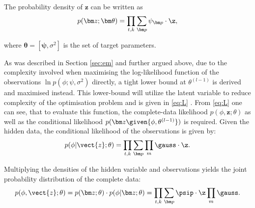 The probability density of $\bm z$ can be written as  %
\begin{equation}
    p(\bm z;\bm\theta)=\prod_{t,k}\sum_{\bm p}\psi_{\bm p}\cdot\z,
\end{equation}

where $\bm\theta=[\bm\psi,\sigma^2]$ is the set of target parameters.


As was described in Section \ref{sec:em} and further argued above, due to the complexity involved when maximising the log-likelihood function of the observations $\ln p(\phi;\psi, \sigma^2)$ directly, a tight lower bound at $\theta^{(l-1)}$ is derived and maximised instead. This lower-bound will utilize the latent variable to reduce complexity of the optimisation problem and is given in \eqref{eq:L} . From \eqref{eq:L} one can see, that to evaluate this function, the complete-data likelihood $p(\phi,\bm z; \theta)$ as well as the conditional likelihood $p(\bm z\given{\phi, \theta^{(l-1)}})$ is required. Given the hidden data, the conditional likelihood of the observations is given by:
\begin{equation}
    p(\phi |\vect{z};\theta)=\prod_{t,k}\sum_{\bm p}\prod_{m}\gauss\cdot\z.
\end{equation}

Multiplying the densities of the hidden variable and observations yields the joint probability distribution of the complete data:
\begin{equation}
    p(\phi,\vect{z};\theta)=p(\bm z;\theta)\cdot p(\phi |\bm z;\theta)=\prod_{t,k}\sum_{\bm p}\psip\cdot\z\prod_{m}\gauss .
\end{equation}

